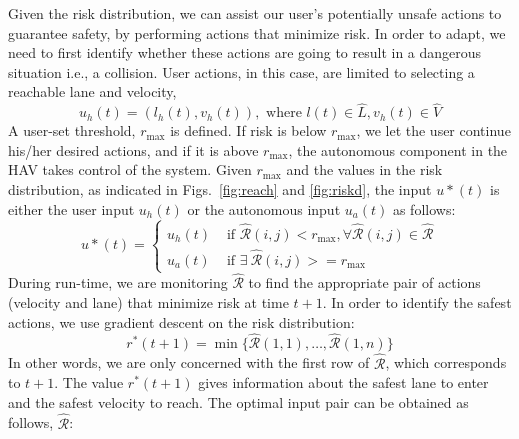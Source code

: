 \documentclass[letterpaper, 10 pt, conference]{ieeeconf}  %
\newcommand\NB[1]{$\spadesuit$\footnote{NB: #1}}
\begin{document}
Given the risk distribution, we can assist our user's potentially unsafe actions to guarantee safety, by performing actions that minimize risk. In order to adapt, we need to first identify whether these actions are going to result in a dangerous situation i.e., a collision. User actions, in this case, are limited to selecting a reachable lane and velocity,
\begin{equation}
u_h(t) = (l_h(t),v_h(t)), \text{ where } l(t)\in\hat{L}, v_h(t)\in\hat{V}
\end{equation}
A user-set threshold, $r_{\max}$ is defined. If risk is below $r_{\max}$, we let the user continue his/her desired actions, and if it is above $r_{\max}$, the autonomous component in the HAV takes control of the system. Given $r_{\max}$ and the values in the risk distribution, as indicated in Figs.~\ref{fig:reach} and \ref{fig:riskd}, the input $u*(t)$ is either the user input $u_h(t)$ or the autonomous input $u_a(t)$ as follows:
\begin{equation} \label{eq:inputctrl}
    u*(t) = \begin{cases}
    u_h(t) & \text{ if } \hat{\mathcal{R}}(i,j) < r_{\max}, \forall\hat{\mathcal{R}}(i,j)\in\hat{\mathcal{R}} \\
    u_a(t) & \text{ if } \exists~\hat{\mathcal{R}}(i,j) >= r_{\max}
    \end{cases}
\end{equation}
During run-time, we are monitoring $\hat{\mathcal{R}}$ to find the appropriate pair of actions (velocity and lane) that minimize risk at time $t+1$. In order to identify the safest actions, we use gradient descent on the risk distribution:
\begin{equation} \label{eq:optpt}
  r^*(t+1) = \min\{\hat{\mathcal{R}}(1,1),\ldots,\hat{\mathcal{R}}(1,n)\}  
\end{equation}
In other words, we are only concerned with the first row of $\hat{\mathcal{R}}$, which corresponds to $t+1$.
The value $r^*(t+1)$ gives information about the safest lane to enter and the safest velocity to reach. The optimal input pair can be obtained as follows, $\hat{\mathcal{R}}$:
\end{document}
